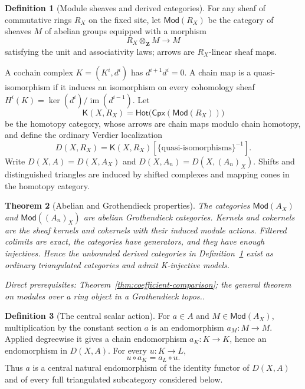 \documentclass[10pt]{article}
\newtheorem{theorem}{Theorem}[section]
\theoremstyle{definition}
\newtheorem{definition}[theorem]{Definition}
\newcommand{\depends}[1]{\par\smallskip\noindent\textit{Direct prerequisites:} #1.}
\begin{document}
\begin{definition}[Module sheaves and derived categories]\label{def:ambient-derived}
For any sheaf of commutative rings $R_X$ on the fixed site, let
$\mathsf{Mod}(R_X)$ be the category of sheaves $M$ of abelian groups
equipped with a morphism
\[
 R_X\otimes_{\mathbf Z}M\longrightarrow M
\]
satisfying the unit and associativity laws; arrows are $R_X$-linear sheaf
maps.

A cochain complex $K=(K^i,d^i)$ has $d^{i+1}d^i=0$.  A chain map is a
quasi-isomorphism if it induces an isomorphism on every cohomology sheaf
$H^i(K)=\ker(d^i)/\operatorname{im}(d^{i-1})$.  Let
\[
 \mathsf K(X,R_X)=
 \mathsf{Hot}\bigl(\mathsf{Cpx}(\mathsf{Mod}(R_X))\bigr)
\]
be the homotopy category, whose arrows are chain maps modulo chain homotopy,
and define the ordinary Verdier localization
\[
 D(X,R_X)=\mathsf K(X,R_X)
       [\{\text{quasi-isomorphisms}\}^{-1}].
\]
Write $D(X,A)=D(X,A_X)$ and $D(X,A_n)=D(X,(A_n)_X)$.  Shifts and
distinguished triangles are induced by shifted complexes and mapping
cones in the homotopy category.
\end{definition}

\begin{theorem}[Abelian and Grothendieck properties]\label{thm:module-grothendieck}
The categories $\mathsf{Mod}(A_X)$ and
$\mathsf{Mod}((A_n)_X)$ are abelian Grothendieck categories.  Kernels and
cokernels are the sheaf kernels and cokernels with their induced module
actions.  Filtered colimits are exact, the categories have generators, and
they have enough injectives.  Hence the unbounded derived categories in
Definition~\ref{def:ambient-derived} exist as ordinary triangulated
categories and admit K-injective models.
\depends{Theorem~\ref{thm:coefficient-comparison}; the general theorem on
modules over a ring object in a Grothendieck topos.}
\end{theorem}

\begin{definition}[The central scalar action]\label{def:central-scalar}
For $a\in A$ and $M\in\mathsf{Mod}(A_X)$, multiplication by the constant
section $a$ is an endomorphism $a_M:M\to M$.  Applied degreewise it gives a
chain endomorphism $a_K:K\to K$, hence an endomorphism in $D(X,A)$.  For
every $u:K\to L$,
\[
 u\circ a_K=a_L\circ u.
\]
Thus $a$ is a central natural endomorphism of the identity functor of
$D(X,A)$ and of every full triangulated subcategory considered below.
\end{definition}
\end{document}

